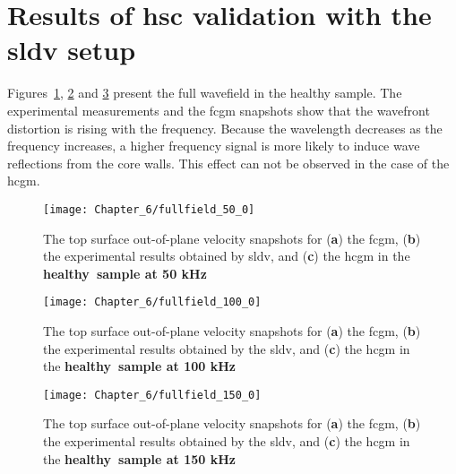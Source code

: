 \section{Results of \acl{hsc} validation with the \acl{sldv} setup}
\label{sec:resuls_sldv}
Figures~\ref{fig:fullfield_50_0}, \ref{fig:fullfield_100_0} and \ref{fig:fullfield_150_0} present the full wavefield in the healthy sample.
The experimental measurements and the \ac{fcgm} snapshots show that the wavefront distortion is rising with the frequency.
Because the wavelength decreases as the frequency increases, a higher frequency signal is more likely to induce wave reflections from the core walls.
This effect can not be observed in the case of the \ac{hcgm}.

\begin{figure}[!hbt]
	\begin{center}
		\texttt{[image: Chapter\_6/fullfield\_50\_0]}
	\end{center}
	\caption{The top surface out-of-plane velocity snapshots for (\textbf{a}) the \acf{fcgm}, (\textbf{b}) the experimental results obtained by \acf{sldv}, and (\textbf{c}) the \acf{hcgm} in the \textbf{healthy~sample at 50 kHz}}
	\label{fig:fullfield_50_0}
\end{figure}
\begin{figure}[!hbt]
	\begin{center}
		\texttt{[image: Chapter\_6/fullfield\_100\_0]}
	\end{center}
	\caption{The top surface out-of-plane velocity snapshots for (\textbf{a}) the \acf{fcgm}, (\textbf{b}) the experimental results obtained by the \acf{sldv}, and (\textbf{c}) the \acf{hcgm} in the \textbf{healthy~sample at 100 kHz}}
	\label{fig:fullfield_100_0}
\end{figure}
\begin{figure}[!hbt]
	\begin{center}
		\texttt{[image: Chapter\_6/fullfield\_150\_0]}
	\end{center}
	\caption{The top surface out-of-plane velocity snapshots for (\textbf{a}) the \acf{fcgm}, (\textbf{b}) the experimental results obtained by the \acf{sldv}, and (\textbf{c}) the \acf{hcgm} in the \textbf{healthy~sample at 150 kHz}}
	\label{fig:fullfield_150_0}
\end{figure}

